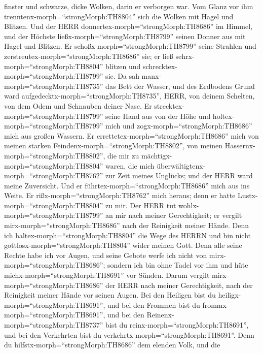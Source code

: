 finster und schwarze, dicke Wolken, darin er verborgen war.
 Vom Glanz vor ihm trenntenx-morph=``strongMorph:TH8804''
sich die Wolken mit Hagel und Blitzen.  Und der HERR
donnertex-morph=``strongMorph:TH8686'' im Himmel, und der Höchste
ließx-morph=``strongMorph:TH8799'' seinen Donner aus mit Hagel und
Blitzen.  Er schoßx-morph=``strongMorph:TH8799'' seine
Strahlen und zerstreutex-morph=``strongMorph:TH8686'' sie; er ließ
sehrx-morph=``strongMorph:TH8804'' blitzen und
schrecktex-morph=``strongMorph:TH8799'' sie.  Da sah
manx-morph=``strongMorph:TH8735'' das Bett der Wasser, und des Erdbodens
Grund ward aufgedecktx-morph=``strongMorph:TH8735'', HERR, von deinem
Schelten, von dem Odem und Schnauben deiner Nase.  Er
strecktex-morph=``strongMorph:TH8799'' seine Hand aus von der Höhe und
holtex-morph=``strongMorph:TH8799'' mich und
zogx-morph=``strongMorph:TH8686'' mich aus großen Wassern. 
Er errettetex-morph=``strongMorph:TH8686'' mich von meinen starken
Feindenx-morph=``strongMorph:TH8802'', von meinen
Hassernx-morph=``strongMorph:TH8802'', die mir zu
mächtigx-morph=``strongMorph:TH8804'' waren,  die mich
überwältigtenx-morph=``strongMorph:TH8762'' zur Zeit meines Unglücks;
und der HERR ward meine Zuversicht.  Und er
führtex-morph=``strongMorph:TH8686'' mich aus ins Weite. Er
rißx-morph=``strongMorph:TH8762'' mich heraus; denn er hatte
Lustx-morph=``strongMorph:TH8804'' zu mir.  Der HERR tut
wohlx-morph=``strongMorph:TH8799'' an mir nach meiner Gerechtigkeit; er
vergilt mirx-morph=``strongMorph:TH8686'' nach der Reinigkeit meiner
Hände.  Denn ich haltex-morph=``strongMorph:TH8804'' die
Wege des HERRN und bin nicht gottlosx-morph=``strongMorph:TH8804'' wider
meinen Gott.  Denn alle seine Rechte habe ich vor Augen,
und seine Gebote werfe ich nicht von mirx-morph=``strongMorph:TH8686'';
 sondern ich bin ohne Tadel vor ihm und hüte
michx-morph=``strongMorph:TH8691'' vor Sünden.  Darum
vergilt mirx-morph=``strongMorph:TH8686'' der HERR nach meiner
Gerechtigkeit, nach der Reinigkeit meiner Hände vor seinen Augen.
 Bei den Heiligen bist du
heiligx-morph=``strongMorph:TH8691'', und bei den Frommen bist du
frommx-morph=``strongMorph:TH8691'',  und bei den
Reinenx-morph=``strongMorph:TH8737'' bist du
reinx-morph=``strongMorph:TH8691'', und bei den Verkehrten bist du
verkehrtx-morph=``strongMorph:TH8691''.  Denn du
hilfstx-morph=``strongMorph:TH8686'' dem elenden Volk, und die
